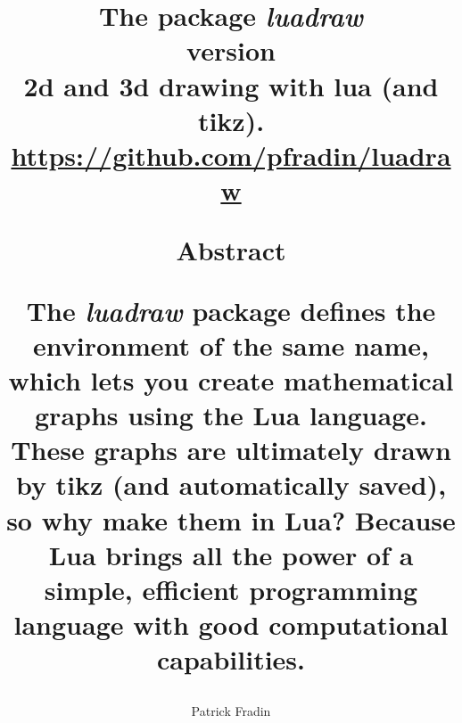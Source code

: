 \documentclass[%
10pt,%
oneside,
a4paper,%
]%
{book}%
\title{\textbf{The package} \emph{luadraw} \\ version \version\\ 2d and 3d drawing with lua (and tikz).\\
{\small \url{https://github.com/pfradin/luadraw}} \\

\vspace{1cm}

\begin{minipage}{16cm}
\small

\hfil\textbf{Abstract}\hfil

The \emph{luadraw} package defines the environment of the same name, which lets you create mathematical graphs using the Lua language. These graphs are ultimately drawn by tikz (and automatically saved), so why make them in Lua? Because Lua brings all the power of a simple, efficient programming language with good computational capabilities.
\end{minipage}
}
\author{Patrick Fradin}
\begin{document}
\maketitle

\setcounter{tocdepth}{3}%
\setcounter{secnumdepth}{2}%

\begin{multicols}{2}
\tableofcontents
\end{multicols}

\listoffigures

\renewcommand{\labelitemi}{$\bullet$}
\renewcommand{\labelitemii}{--}
\renewcommand{\labelitemiii}{$*$}
\renewcommand{\thesection}{\Roman{section}~}
\renewcommand{\thesubsection}{\arabic{subsection})}
\renewcommand{\thesubsubsection}{\arabic{subsection}.\arabic{subsubsection}}
\renewcommand{\thefigure}{\arabic{figure}}
\newcommand{\og}{"}
\newcommand{\fg}{"}



\end{document}
